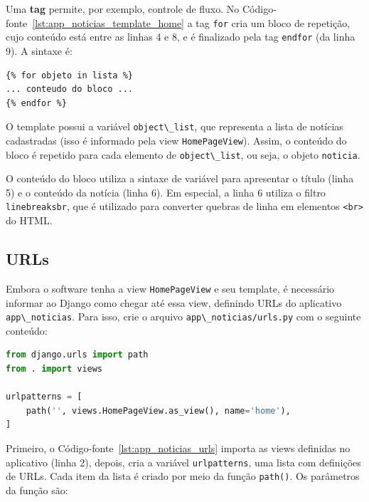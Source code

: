 \documentclass[brazil,a4paper,oneside,openright,parskip=full]{book}
\newcommand{\passthrough}[1]{#1}
\begin{document}
Uma \textbf{tag} permite, por exemplo, controle de fluxo. No
Código-fonte~\ref{lst:app_noticias_template_home} a tag
\passthrough{\lstinline!for!} cria um bloco de repetição, cujo conteúdo
está entre as linhas 4 e 8, e é finalizado pela tag
\passthrough{\lstinline!endfor!} (da linha 9). A sintaxe é:

\begin{lstlisting}[style=nonumber]
{% for objeto in lista %}
... conteudo do bloco ...
{% endfor %}
\end{lstlisting}

O template possui a variável \passthrough{\lstinline!object\_list!}, que
representa a lista de notícias cadastradas (isso é informado pela view
\passthrough{\lstinline!HomePageView!}). Assim, o conteúdo do bloco é
repetido para cada elemento de \passthrough{\lstinline!object\_list!},
ou seja, o objeto \passthrough{\lstinline!noticia!}.

O conteúdo do bloco utiliza a sintaxe de variável para apresentar o
título (linha 5) e o conteúdo da notícia (linha 6). Em especial, a linha
6 utiliza o filtro \passthrough{\lstinline!linebreaksbr!}, que é
utilizado para converter quebras de linha em elementos
\passthrough{\lstinline!<br>!} do HTML.

\hypertarget{urls}{%
\subsection{URLs}\label{urls}}

Embora o software tenha a view \passthrough{\lstinline!HomePageView!} e
seu template, é necessário informar ao Django como chegar até essa view,
definindo URLs do aplicativo \passthrough{\lstinline!app\_noticias!}.
Para isso, crie o arquivo
\passthrough{\lstinline!app\_noticias/urls.py!} com o seguinte conteúdo:

\begin{lstlisting}[language=Python, caption={Código inicial para as URLs do aplicativo Notícias}, label=lst:app_noticias_urls]
from django.urls import path
from . import views

urlpatterns = [
    path('', views.HomePageView.as_view(), name='home'),
]
\end{lstlisting}

Primeiro, o Código-fonte~\ref{lst:app_noticias_urls} importa as views
definidas no aplicativo (linha 2), depois, cria a variável
\passthrough{\lstinline!urlpatterns!}, uma lista com definições de URLs.
Cada item da lista é criado por meio da função
\passthrough{\lstinline!path()!}. Os parâmetros da função são:
\end{document}
